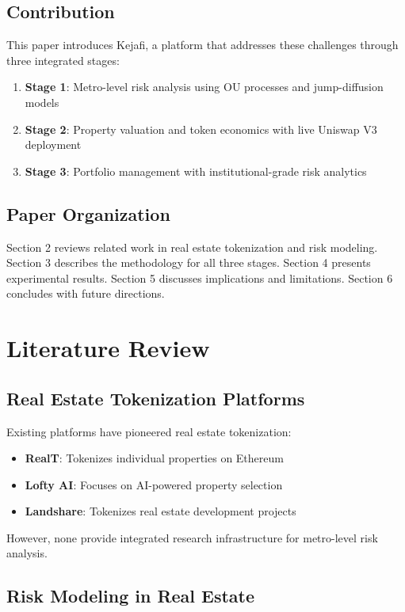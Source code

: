 ﻿\documentclass[12pt]{article}
\begin{document}
\subsection{Contribution}

This paper introduces Kejafi, a platform that addresses these challenges through three integrated stages:

\begin{enumerate}
    \item \textbf{Stage 1}: Metro-level risk analysis using OU processes and jump-diffusion models
    \item \textbf{Stage 2}: Property valuation and token economics with live Uniswap V3 deployment
    \item \textbf{Stage 3}: Portfolio management with institutional-grade risk analytics
\end{enumerate}

\subsection{Paper Organization}

Section 2 reviews related work in real estate tokenization and risk modeling. Section 3 describes the methodology for all three stages. Section 4 presents experimental results. Section 5 discusses implications and limitations. Section 6 concludes with future directions.

\section{Literature Review}

\subsection{Real Estate Tokenization Platforms}

Existing platforms have pioneered real estate tokenization:
\begin{itemize}
    \item \textbf{RealT}: Tokenizes individual properties on Ethereum
    \item \textbf{Lofty AI}: Focuses on AI-powered property selection
    \item \textbf{Landshare}: Tokenizes real estate development projects
\end{itemize}
However, none provide integrated research infrastructure for metro-level risk analysis.

\subsection{Risk Modeling in Real Estate}
\end{document}
